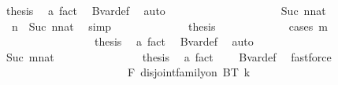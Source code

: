 \begin{isabellebody}
\ {\isacharquery}{\kern0pt}thesis\ \isamarkupfalse%
\ a\ fact{}\ \isamarkupfalse%
\ Bvar{\isacharunderscore}{\kern0pt}def\ \isamarkupfalse%
\ auto\isanewline
\ \ \ \ \ \ \ \ \isamarkupfalse%
\isanewline
\ \ \ \ \ \ \ \ \ \ \isamarkupfalse%
\ {\isacharparenleft}{\kern0pt}Suc\ nnat{\isacharparenright}{\kern0pt}\isanewline
\ \ \ \ \ \ \ \ \ \ \isamarkupfalse%
\ \isamarkupfalse%
\ {\isacharasterisk}{\kern0pt}{\isacharcolon}{\kern0pt}\ {\isachardoublequoteopen}n\ {\isacharequal}{\kern0pt}\ Suc\ nnat{\isachardoublequoteclose}\ \isamarkupfalse%
\ simp\isanewline
\ \ \ \ \ \ \ \ \ \ \isamarkupfalse%
\ \isamarkupfalse%
\ {\isacharquery}{\kern0pt}thesis\ \isanewline
\ \ \ \ \ \ \ \ \ \ \isamarkupfalse%
\ {\isacharparenleft}{\kern0pt}cases\ m{\isacharparenright}{\kern0pt}\isanewline
\ \ \ \ \ \ \ \ \ \ \ \ \isamarkupfalse%
\ {}\isanewline
\ \ \ \ \ \ \ \ \ \ \ \ \isamarkupfalse%
\ \isamarkupfalse%
\ {\isacharquery}{\kern0pt}thesis\ \isamarkupfalse%
\ a\ fact{}\ \isamarkupfalse%
\ Bvar{\isacharunderscore}{\kern0pt}def\ \isamarkupfalse%
\ auto\isanewline
\ \ \ \ \ \ \ \ \ \ \isamarkupfalse%
\isanewline
\ \ \ \ \ \ \ \ \ \ \ \ \isamarkupfalse%
\ {\isacharparenleft}{\kern0pt}Suc\ mnat{\isacharparenright}{\kern0pt}\isanewline
\ \ \ \ \ \ \ \ \ \ \ \ \isamarkupfalse%
\ \isamarkupfalse%
\ {\isacharquery}{\kern0pt}thesis\ \isamarkupfalse%
\ a\ fact{}\ \ {\isacharasterisk}{\kern0pt}\ \isamarkupfalse%
\ Bvar{\isacharunderscore}{\kern0pt}def\ \isamarkupfalse%
\ fastforce\isanewline
\ \ \ \ \ \ \ \ \ \ \isamarkupfalse%
\isanewline
\ \ \ \ \ \ \ \ \isamarkupfalse%
\isanewline
\ \ \ \ \ \ \isamarkupfalse%
\isanewline
\isanewline
\ \ \ \ \ \ \isamarkupfalse%
\ F{}{\isacharcolon}{\kern0pt}\ {\isachardoublequoteopen}disjoint{\isacharunderscore}{\kern0pt}family{\isacharunderscore}{\kern0pt}on\ BT\ {\isacharbraceleft}{\kern0pt}{\isachardot}{\kern0pt}{\isachardot}{\kern0pt}k{\isacharplus}{\kern0pt}{}{\isacharbraceright}{\kern0pt}{\isachardoublequoteclose}\isanewline
\ \ \ \ \ \ \isamarkupfalse%
\isanewline
\ \ \ \ \ \ \ \ \isamarkupfalse%

\end{isabellebody}
